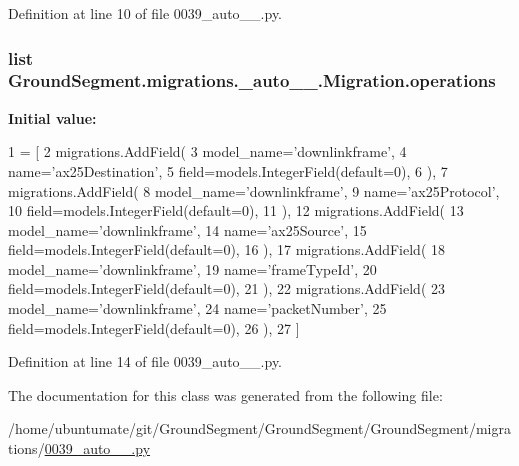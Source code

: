 Definition at line 10 of file 0039\+\_\+auto\+\_\+\_.\+py.

\hypertarget{class_ground_segment_1_1migrations_1_10039__auto__20170131__2008_1_1_migration_a32138965e26dddecb0f339eeeada1df2}{}
\subsubsection[{operations}]{\setlength{\rightskip}{0pt plus 5cm}list Ground\+Segment.\+migrations.\+\_\+auto\+\_\+\_.\+Migration.\+operations\hspace{0.3cm}{\ttfamily [static]}}\label{class_ground_segment_1_1migrations_1_10039__auto__20170131__2008_1_1_migration_a32138965e26dddecb0f339eeeada1df2}
{\bfseries Initial value\+:}
\begin{DoxyCode}
1 = [
2         migrations.AddField(
3             model\_name=\textcolor{stringliteral}{'downlinkframe'},
4             name=\textcolor{stringliteral}{'ax25Destination'},
5             field=models.IntegerField(default=0),
6         ),
7         migrations.AddField(
8             model\_name=\textcolor{stringliteral}{'downlinkframe'},
9             name=\textcolor{stringliteral}{'ax25Protocol'},
10             field=models.IntegerField(default=0),
11         ),
12         migrations.AddField(
13             model\_name=\textcolor{stringliteral}{'downlinkframe'},
14             name=\textcolor{stringliteral}{'ax25Source'},
15             field=models.IntegerField(default=0),
16         ),
17         migrations.AddField(
18             model\_name=\textcolor{stringliteral}{'downlinkframe'},
19             name=\textcolor{stringliteral}{'frameTypeId'},
20             field=models.IntegerField(default=0),
21         ),
22         migrations.AddField(
23             model\_name=\textcolor{stringliteral}{'downlinkframe'},
24             name=\textcolor{stringliteral}{'packetNumber'},
25             field=models.IntegerField(default=0),
26         ),
27     ]
\end{DoxyCode}


Definition at line 14 of file 0039\+\_\+auto\+\_\+\_.\+py.



The documentation for this class was generated from the following file\+:\begin{DoxyCompactItemize}
\item 
/home/ubuntumate/git/\+Ground\+Segment/\+Ground\+Segment/\+Ground\+Segment/migrations/\hyperlink{0039__auto__20170131__2008_8py}{0039\+\_\+auto\+\_\+\_.\+py}\end{DoxyCompactItemize}
